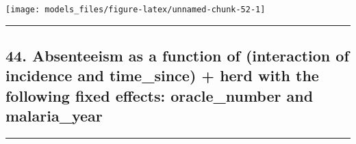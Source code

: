 \documentclass[]{article}
\begin{document}
\begin{center}\texttt{[image: models\_files/figure-latex/unnamed-chunk-52-1]} \end{center}

\newpage

\begin{center}\rule{0.5\linewidth}{\linethickness}\end{center}

\subsection{44. Absenteeism as a function of (interaction of incidence
and time\_since) + herd with the following fixed effects: oracle\_number
and
malaria\_year}\label{absenteeism-as-a-function-of-interaction-of-incidence-and-time_since-herd-with-the-following-fixed-effects-oracle_number-and-malaria_year}

\begin{center}\rule{0.5\linewidth}{\linethickness}\end{center}
\end{document}
